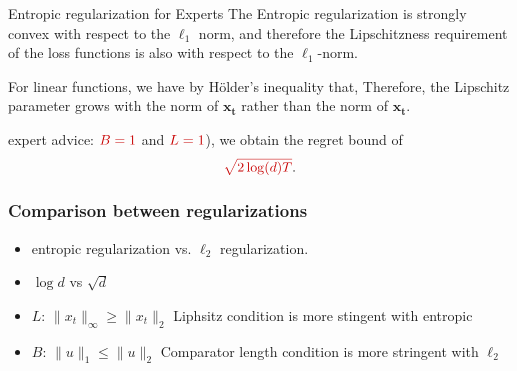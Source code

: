 \documentclass[handout]{beamer}
\newcommand{\redmath}[1]{\textcolor{mathred}{#1}}
\begin{document}
\begin{frame}{Entropic regularization for Experts}
    The Entropic regularization is strongly convex with respect to the \( \ell_1 \) norm, and therefore the Lipschitzness requirement of the loss functions is also with respect to the \( \ell_1 \)-norm. 
    
    For linear functions, 
    \R{\[
    f_t(\mathbf{w}) = \langle \mathbf{w}, \mathbf{x_t} \rangle,
    \]}
    we have by Hölder’s inequality that,
    \R{\[
    | f_t(\mathbf{w}) - f_t(\mathbf{u}) | = | \langle \mathbf{w} - \mathbf{u}, \mathbf{x_t} \rangle | 
    \leq \| \mathbf{w} - \mathbf{u} \|_1 \|\mathbf{x_t} \|_\infty.
    \]}
    Therefore, the Lipschitz parameter grows with the \R{\( \ell_\infty \)} norm of \( \mathbf{x_t} \) rather than the  norm of \( \mathbf{x_t} \). 
    
    expert advice: \( \redmath{B = 1} \) and \( \redmath{L = 1} \)), we obtain the regret bound of 
    \[
    \redmath{\sqrt{2\log(d)T}}.
    \]
\end{frame}

\begin{frame}
  \frametitle{Comparison between regularizations}
  \begin{itemize}
  \item entropic regularization vs. $\ell_2$ regularization.
  \item $\log {d}$ vs $\sqrt{d}$
  \item $L$: $\|x_t\|_{\infty} \geq \|x_t\|_{2}$ Liphsitz condition is more stingent with entropic
  \item $B$: $\|u\|_1 \leq \|u\|_{2}$ Comparator length condition is more stringent with $\ell_2$
  \end{itemize}
\end{frame}
\end{document}
